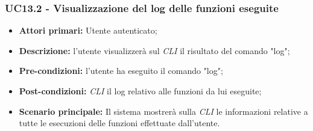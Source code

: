 \subsubsection{UC13.2 - Visualizzazione del log delle funzioni eseguite}
\begin{itemize}
	\item \textbf{Attori primari:} Utente autenticato;
	\item \textbf{Descrizione:} l'utente visualizzerà sul \textit{CLI\glo} il risultato del comando "log";
	\item \textbf{Pre-condizioni:} l'utente ha eseguito il comando "log";
	\item \textbf{Post-condizioni:} \textit{CLI\glo} il log relativo alle funzioni da lui eseguite;
	\item \textbf{Scenario principale:} Il sistema mostrerà sulla \textit{CLI\glo} le informazioni relative a tutte le esecuzioni delle funzioni effettuate dall'utente.
\end{itemize}
